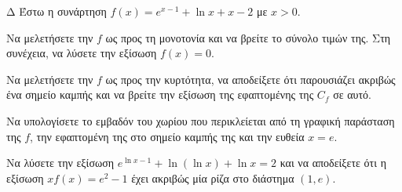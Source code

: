 \begin{thema}{Δ}
Έστω η συνάρτηση $\displaystyle f(x) = e^{x-1} + \ln x + x - 2$ με $x>0$.
\begin{erwthma}
    \item Να μελετήσετε την $f$ ως προς τη μονοτονία και να βρείτε το σύνολο τιμών της. Στη συνέχεια, να λύσετε την εξίσωση $f(x) = 0$.
    \item Να μελετήσετε την $f$ ως προς την κυρτότητα, να αποδείξετε ότι παρουσιάζει ακριβώς ένα σημείο καμπής και να βρείτε την εξίσωση της εφαπτομένης της $C_f$ σε αυτό.
    \item Να υπολογίσετε το εμβαδόν του χωρίου που περικλείεται από τη γραφική παράσταση της $f$, την εφαπτομένη της στο σημείο καμπής της και την ευθεία $x=e$.
    \item Να λύσετε την εξίσωση $e^{\ln x - 1} + \ln(\ln x) + \ln x = 2$ και να αποδείξετε ότι η εξίσωση $x f(x) = e^2 - 1$ έχει ακριβώς μία ρίζα στο διάστημα $(1, e)$.
\end{erwthma}
\end{thema}

